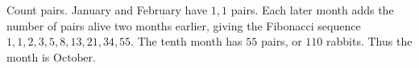 Count pairs. January and February have $1,1$ pairs. Each later month adds the number of pairs alive two months earlier, giving the Fibonacci sequence $1,1,2,3,5,8,13,21,34,55$. The tenth month has $55$ pairs, or $110$ rabbits. Thus the month is $\boxed{\text{October}}$.
